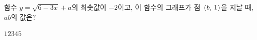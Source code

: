 \hspace*{2mm}\begin{minipage}[t]{\dimexpr\linewidth-2mm\relax}\vspace{0pt}
함수 $y=\sqrt{6-3x}+a$의 최솟값이 $-2$이고, 이 함수의 그래프가 점~$(b,\mkern3mu 1)$을 지날 때, $ab$의 값은? 
\begin{choices32}{$1$}{$2$}{$3$}{$4$}{$5$}\end{choices32}\end{minipage}

